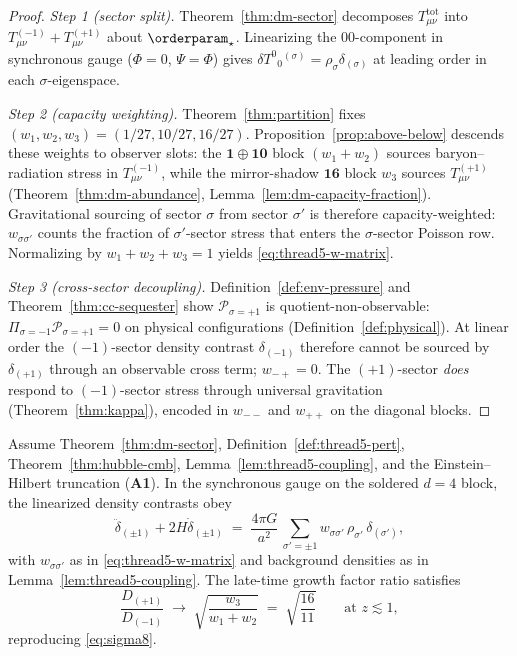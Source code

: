 \begin{proof}
\emph{Step 1 (sector split).}
Theorem~\ref{thm:dm-sector} decomposes $T_{\mu\nu}^{\mathrm{tot}}$ into
$T_{\mu\nu}^{(-1)}+T_{\mu\nu}^{(+1)}$ about $\orderparam_\star$. Linearizing
the $00$-component in synchronous gauge ($\Phi=0$, $\Psi=\Phi$) gives
$\delta T^{0}{}_{0}{}^{(\sigma)}=\rho_\sigma\delta_{(\sigma)}$ at leading
order in each $\sigma$-eigenspace.

\emph{Step 2 (capacity weighting).}
Theorem~\ref{thm:partition} fixes $(w_1,w_2,w_3)=(1/27,10/27,16/27)$.
Proposition~\ref{prop:above-below} descends these weights to observer slots:
the $\mathbf{1}\oplus\mathbf{10}$ block $(w_1+w_2)$ sources baryon--radiation
stress in $T_{\mu\nu}^{(-1)}$, while the mirror-shadow $\mathbf{16}$ block
$w_3$ sources $T_{\mu\nu}^{(+1)}$ (Theorem~\ref{thm:dm-abundance},
Lemma~\ref{lem:dm-capacity-fraction}). Gravitational sourcing of sector
$\sigma$ from sector $\sigma'$ is therefore capacity-weighted:
$w_{\sigma\sigma'}$ counts the fraction of $\sigma'$-sector stress that
enters the $\sigma$-sector Poisson row. Normalizing by
$w_1+w_2+w_3=1$ yields \eqref{eq:thread5-w-matrix}.

\emph{Step 3 (cross-sector decoupling).}
Definition~\ref{def:env-pressure} and Theorem~\ref{thm:cc-sequester} show
$\mathcal{P}_{\sigma=+1}$ is quotient-non-observable:
$\Pi_{\sigma=-1}\mathcal{P}_{\sigma=+1}=0$ on physical configurations
(Definition~\ref{def:physical}). At linear order the $(-1)$-sector density
contrast $\delta_{(-1)}$ therefore cannot be sourced by $\delta_{(+1)}$ through
an observable cross term; $w_{-+}=0$. The $(+1)$-sector \emph{does} respond to
$(-1)$-sector stress through universal gravitation (Theorem~\ref{thm:kappa}),
encoded in $w_{--}$ and $w_{++}$ on the diagonal blocks.
\end{proof}

\begin{theorem}
\label{thm:thread5-target}
Assume Theorem~\ref{thm:dm-sector}, Definition~\ref{def:thread5-pert},
Theorem~\ref{thm:hubble-cmb}, Lemma~\ref{lem:thread5-coupling}, and the
Einstein--Hilbert truncation (\textbf{A1}). In the synchronous gauge on the
soldered $d=4$ block, the linearized density contrasts obey
\begin{equation}\label{eq:thread5-growth}
  \ddot\delta_{(\pm1)}+2H\dot\delta_{(\pm1)}
  \;=\;
  \frac{4\pi G}{a^2}\,
  \sum_{\sigma'=\pm1}
  w_{\sigma\sigma'}\,\rho_{\sigma'}\,\delta_{(\sigma')},
\end{equation}
with $w_{\sigma\sigma'}$ as in \eqref{eq:thread5-w-matrix} and background
densities as in Lemma~\ref{lem:thread5-coupling}. The late-time growth factor
ratio satisfies
\begin{equation}\label{eq:thread5-growth-ratio}
  \frac{D_{(+1)}}{D_{(-1)}}
  \;\longrightarrow\;
  \sqrt{\frac{w_3}{w_1+w_2}}
  \;=\;
  \sqrt{\frac{16}{11}}
  \qquad
  \text{at } z\lesssim 1,
\end{equation}
reproducing \eqref{eq:sigma8}.
\end{theorem}

